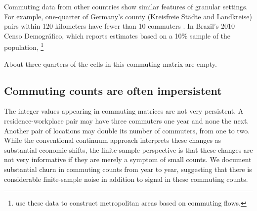 \documentclass[11pt]{article}
\theoremstyle{definition}
\begin{document}
Commuting data from other countries show similar features of granular settings. 
For example,
one-quarter of Germany's county (Kreisfreie St\"{a}dte and Landkreise) pairs within 120 kilometers have fewer than 10 commuters .
In Brazil's 2010 Censo Demogr\'{a}fico, which reports estimates based on a 10\% sample of the population,
%
\footnote{ use these data to construct metropolitan areas based on commuting flows.}

About three-quarters of the cells in this commuting matrix are empty.

\subsection{Commuting counts are often impersistent} \label{sec:impersistent}

The integer values appearing in commuting matrices are not very persistent.
A residence-workplace pair may have three commuters one year and none the next.
Another pair of locations may double its number of commuters, from one to two.
While the conventional continuum approach interprets these changes as substantial economic shifts,
the finite-sample perspective is that these changes are not very informative if they are merely a symptom of small counts.
We document substantial churn in commuting counts from year to year,
suggesting that there is considerable finite-sample noise in addition to signal in these commuting counts.
\end{document}
